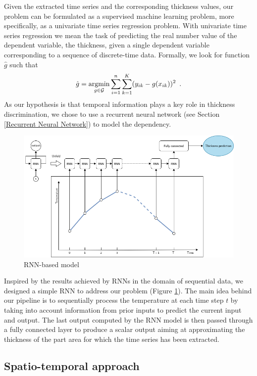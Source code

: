 Given the extracted time series and the corresponding thickness values, our problem can be formulated as a supervised machine learning problem, more specifically, as a univariate time series regression problem. With univariate time series regression we mean the task of predicting the real number value of the dependent variable, the thickness, given a single dependent variable corresponding to a sequence of discrete-time data. Formally, we look for function $\hat{g}$ such that
\begin{equation}
    \hat{g} = \operatorname*{argmin}_{g\in\mathcal{G}} \sum_{i=1}^n \sum_{k=1}^K (y_{ik} - g(x_{ik}))^2 \enspace.
\end{equation}
%
As our hypothesis is that temporal information plays a key role in thickness discrimination, we chose to use a recurrent neural network (see Section \ref{Recurrent Neural Network}) to model the dependency. 
%
\begin{figure}
\centering
\includegraphics[scale=0.45]{images/chapter_4/rnn_model.png}
\caption{RNN-based model}
\label{fig:rnn_model}
\end{figure}
%
Inspired by the results achieved by RNNs in the domain of sequential data, we designed a simple RNN to address our problem (Figure \ref{fig:rnn_model}). The main idea behind our pipeline is to sequentially process the temperature at each time step $t$ by taking into account information from prior inputs to predict the current input and output. The last output computed by the RNN model is then passed through a fully connected layer to produce a scalar output aiming at approximating the thickness of the part area for which the time series has been extracted.

\subsection{Spatio-temporal approach} \label{Spatio-temporal approach}

